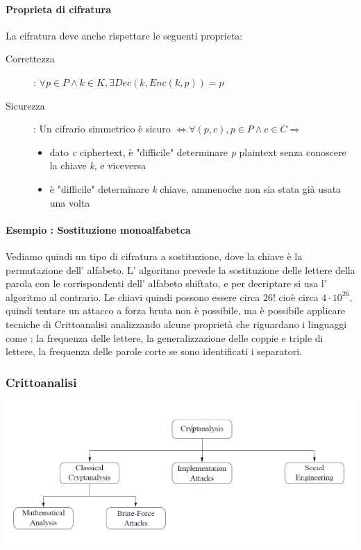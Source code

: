 \documentclass{report}
\begin{document}
        \paragraph{Proprieta di cifratura}
            La cifratura deve anche rispettare le seguenti proprieta: 
            \begin{description}
                 \item[Correttezza]: $\forall p \in P \land k \in K, \exists Dec(k,Enc(k,p)) = p$
                 \item[Sicurezza]:  Un cifrario simmetrico è sicuro $\iff \forall (p,c), p \in P \land c \in C  \Rightarrow$ 
                 \begin{itemize}
                            \item dato \textit{c} ciphertext, è "difficile" determinare \textit{p} plaintext senza conoscere la chiave \textit{k}, e viceversa
                            \item è "difficile" determinare \textit{k} chiave, ammenoche non sia stata già usata una volta
               \end{itemize}
            \end{description}

        \paragraph{Esempio : Sostituzione monoalfabetca} 
            Vediamo quindi un tipo di cifratura a sostituzione, dove la chiave è la permutazione dell' alfabeto. L' algoritmo prevede la sostituzione delle lettere della parola con le corrispondenti dell' alfabeto shiftato, e per decriptare si usa l' algoritmo al contrario. Le chiavi quindi possono essere circa  26! cioè circa $4\cdot10^26$, quindi tentare un attacco a forza bruta non è possibile, ma è possibile applicare tecniche di Crittoanalisi analizzando alcune proprietà che riguardano i linguaggi come : la frequenza delle lettere, la generalizzazione delle coppie e triple di lettere, la frequenza delle parole corte se sono identificati i separatori.  
    \subsubsection{Crittoanalisi}        
            \includegraphics{./immagini/crittoanalisi.png}
               
\end{document}
